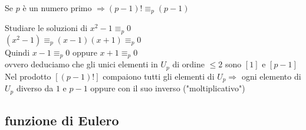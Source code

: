\documentclass[12px]{article}
\begin{document}
		 \begin{teo}
		 	Se $p$ è un numero primo $  \Rightarrow (p-1)! \equiv_p (p-1)$\\
		 \end{teo}
\begin{dimo}
	Studiare le soluzioni di $x^2 - 1 \equiv_p 0$\\
	$(x^2-1)\equiv_p (x-1)(x+1)\equiv_p 0$\\
	Quindi $x-1\equiv_p 0$ oppure  $x + 1\equiv_p 0$\\
	ovvero deduciamo che gli unici elementi in  $U_p$ di ordine $\leq 2 $ sono $[1]$ e $[p-1]$\\
	Nel prodotto  $[(p-1)!]$ compaiono tutti gli elementi di $U_p \Rightarrow $   ogni elemento di $U_p$ diverso da  $1$ e $p-1$ oppure con il suo inverso ("moltiplicativo")
\end{dimo}
\subsection{funzione di Eulero}
\end{document}
